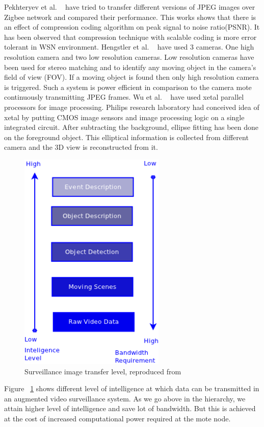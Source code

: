 \indent Pekhteryev et al. ~\cite{2} have tried to transfer different
versions of JPEG images over Zigbee network and compared their
performance. This works shows that there is an effect of compression
coding algorithm on peak signal to noise ratio(PSNR). It has been
observed that compression technique with scalable coding is more error
tolerant in WSN environment. Hengstler et al. ~\cite{3, 5} have used 3
cameras. One high resolution camera and two low resolution cameras. Low
resolution cameras have been used for stereo matching and to identify
any moving object in the camera's field of view (FOV). If a moving
object is found then only high resolution camera is triggered. Such a
system is power efficient in  comparison to the camera mote continuously
transmitting JPEG frames. Wu et al.  ~\cite{4} have used xetal parallel
processors for image processing.  Philips research laboratory had
conceived idea of xetal by putting CMOS image sensors and image
processing logic on a single integrated circuit.  After subtracting the
background, ellipse fitting has been done on the foreground object. This
elliptical information is collected from different camera and the 3D
view is reconstructed from it.\\


\begin{figure}[!t]
\centering
\includegraphics[height=300pt]{Figures/image_tr_level}
\caption{Surveillance image transfer level, reproduced from ~\cite{3}}
\label{image_tr_level}
\end{figure}

\indent Figure ~\ref{image_tr_level} shows different level of
intelligence at which data can be transmitted in an augmented video
surveillance system. As we go above in the hierarchy, we attain higher
level of intelligence and save lot of bandwidth. But this is achieved at
the cost of increased computational power required at the mote node.\\

